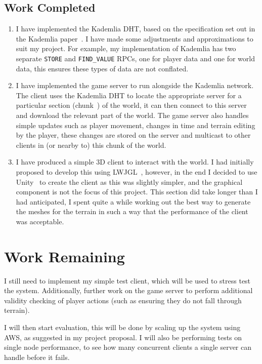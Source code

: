 \documentclass[11pt,a4paper]{article}
\begin{document}
	\subsection{Work Completed}
	\begin{enumerate}
		\item I have implemented the Kademlia DHT, based on the specification set out in the Kademlia paper~\cite{kademlia}. I have made some adjustments and approximations to suit my project. For example, my implementation of Kademlia has two separate \texttt{STORE} and \texttt{FIND\_VALUE} RPCs, one for player data and one for world data, this ensures these types of data are not conflated.
		\item I have implemented the game server to run alongside the Kademlia network. The client uses the Kademlia DHT to locate the appropriate server for a particular section (chunk~\cite{chunk}) of the world, it can then connect to this server and download the relevant part of the world. The game server also handles simple updates such as player movement, changes in time and terrain editing by the player, these changes are stored on the server and multicast to other clients in (or nearby to) this chunk of the world.
		\item I have produced a simple 3D client to interact with the world. I had initially proposed to develop this using LWJGL~\cite{lwjgl}, however, in the end I decided to use Unity~\cite{unity} to create the client as this was slightly simpler, and the graphical component is not the focus of this project. This section did take longer than I had anticipated, I spent quite a while working out the best way to generate the meshes for the terrain in such a way that the performance of the client was acceptable.
	\end{enumerate}
	\section{Work Remaining}
	I still need to implement my simple test client, which will be used to stress test the system. Additionally, further work on the game server to perform additional validity checking of player actions (such as ensuring they do not fall through terrain).
	
	I will then start evaluation, this will be done by scaling up the system using AWS, as suggested in my project proposal. I will also be performing tests on single node performance, to see how many concurrent clients a single server can handle before it fails.
	
\end{document}

